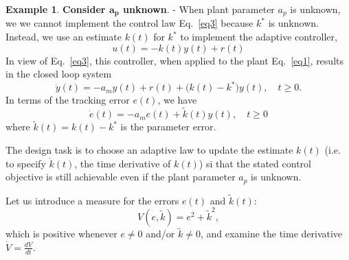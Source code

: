 \documentclass[11pt,a4paper,oneside]{book}
\numberwithin{equation}{section}
\theoremstyle{it}
\theoremstyle{definition}
\newtheorem{example}{Example}[chapter]
\begin{document}
\begin{example}
	\textbf{Consider $\boldsymbol{a_p}$ unknown}. - When plant parameter $a_p$ is unknown, we we cannot implement the control law Eq.~\ref{eq3} because $k^*$ is unknown. Instead, we use an estimate $k(t)$ for $k^*$ to implement the adaptive controller,
	\begin{equation}\label{eq7}
		u(t)=-k(t)y(t)+r(t)
	\end{equation}
	In view of Eq.~\ref{eq3}, this controller, when applied to the plant Eq.~\ref{eq1}, results in the closed loop system 
	\begin{equation}\label{eq8}
		\dot{y}(t)=-a_my(t)+r(t)+\big(k(t)-k^*\big)y(t),\quad t\ge0.
	\end{equation}
	In terms of the tracking error $e(t)$, we have
	\begin{equation}\label{eq9}
		\dot{e}(t)=-a_me(t)+\tilde{k}(t)y(t),\quad t\ge0
	\end{equation} 
	where $\tilde{k}(t)=k(t)-k^*$ is the parameter error.
	
	The design task is to choose an adaptive law to update the estimate $k(t)$ (i.e. to specify $\dot{k}(t)$, the time derivative of $k(t)$) si that the stated control objective is still achievable even if the plant parameter $a_p$ is unknown. 
	
	Let us introduce a measure for the errors $e(t)$ and $\tilde{k}(t)$: 
	\begin{equation}\label{eq10}
		V(e,\tilde{k})=e^2+\tilde{k}^2,
	\end{equation} 
	which is positive whenever $e\ne0$ and/or $\tilde{k}\ne0$, and examine the time derivative $\dot{V}=\frac{dV}{dt}$.
	

\end{example}
\end{document}
